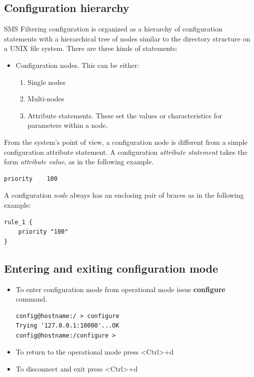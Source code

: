 \documentclass[a4paper,latin]{paper}
\begin{document}
\subsection{Configuration hierarchy}

SMS Filtering configuration is organized as a hierarchy of configuration statements with a
hierarchical tree of nodes similar to the directory structure on a UNIX file system. There are
three kinds of statements:
\begin{itemize}
	\item Configuration nodes. This can be either:
		\begin{enumerate}
			\item Single nodes
			\item Multi-nodes
			\item Attribute statements. These set the values or characteristics for parameters within a node.
		\end{enumerate}
\end{itemize}
From the system’s point of view, a configuration node is different from a simple
configuration attribute statement. A configuration \textit{attribute statement} takes the form
\textit{attribute value}, as in the following example.
\begin{lstlisting}[style=BashInputStyle]
priority    100
\end{lstlisting}
A configuration \textit{node} always has an enclosing pair of braces as in the following example:
\begin{lstlisting}[style=BashInputStyle]
rule_1 {
    priority "100"
}
\end{lstlisting}

\subsection{Entering and exiting configuration mode}

\begin{itemize}
	\item To enter configuration mode from operational mode issue \textbf{configure} command.
		\begin{lstlisting}[style=BashInputStyle]
config@hostname:/ > configure
Trying '127.0.0.1:10000'...OK
config@hostname:/configure >
		\end{lstlisting}
	\item To return to the operational mode press \textless{}Ctrl\textgreater+d
	\item To disconnect and exit press \textless{}Ctrl\textgreater+d
\end{itemize}
\end{document}
